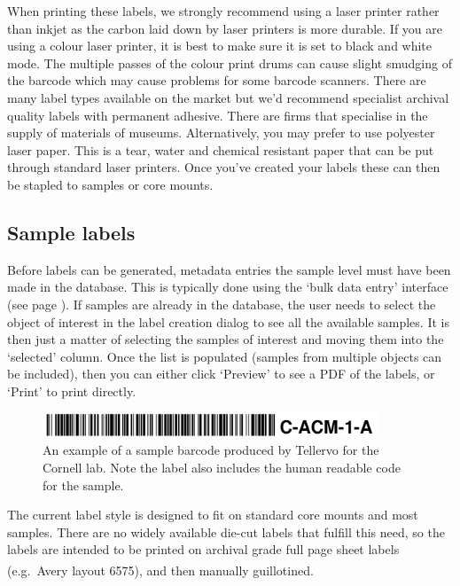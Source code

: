 When printing these labels, we strongly recommend using a laser printer rather than inkjet as the carbon laid down by laser printers is more durable.  If you are using a colour laser printer, it is best to make sure it is set to black and white mode.  The multiple passes of the colour print drums can cause slight smudging of the barcode which may cause problems for some barcode scanners.  There are many label types available on the market but we'd recommend specialist archival quality labels with permanent adhesive. There are firms that specialise in the supply of materials of museums.  Alternatively, you may prefer to use polyester laser paper.  This is a tear, water and chemical resistant paper that can be put through standard laser printers.  Once you've created your labels these can then be stapled to samples or core mounts.

\subsection{Sample labels}
Before labels can be generated, metadata entries the sample level must have been made in the database.  This is typically done using the `bulk data entry' interface (see page \pageref{txt:bulkentry}).  If samples are already in the database, the user needs to select the object of interest in the label creation dialog to see all the available samples.  It is then just a matter of selecting the samples of interest and moving them into the `selected' column.  Once the list is populated (samples from multiple objects can be included), then you can either click `Preview' to see a PDF of the labels, or `Print' to print directly.

\begin{figure}[hbtp]
  \centering
    \includegraphics[width=100mm]{Images/samplebarcode.png}
    \caption{An example of a sample barcode produced by Tellervo for the Cornell lab.  Note the label also includes the human readable code for the sample.}
    \label{fig:graph}
\end{figure}

The current label style is designed to fit on standard core mounts and most samples.  There are no widely available die-cut labels that fulfill this need, so the labels are intended to be printed on archival grade full page sheet labels (e.g.\ Avery\textsuperscript{\textregistered} layout 6575), and then manually guillotined.  

